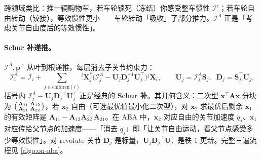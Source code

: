 跨领域类比：推一辆购物车，若车轮锁死（冻结）你感受整车惯性 $\mathcal I^c$；若车轮自由转动（铰接），等效惯性更小——车轮转动「吸收」了部分推力。$\mathcal I^A$ 正是「考虑关节自由度后的等效惯性」。

\paragraph{Schur 补递推。}
$\mathcal I^A,\mathbf p^A$ 从叶到根递推，每层消去子关节约束力：
\begin{equation}
  \mathcal I_i^A=\mathcal I_i+\sum_{j\in\text{children}(i)}{}^i\mathbf X_j^*\Big(\mathcal I_j^A-\mathbf U_j\mathbf D_j^{-1}\mathbf U_j^\top\Big){}^j\mathbf X_i,
  \qquad \mathbf U_j=\mathcal I_j^A\mathbf S_j,\;\; \mathbf D_j=\mathbf S_j^\top\mathbf U_j.
  \label{eq:on-aba-schur}
\end{equation}
括号内 $\mathcal I_j^A-\mathbf U_j\mathbf D_j^{-1}\mathbf U_j^\top$ 正是经典的 \textbf{Schur 补}。其几何含义：二次型 $\mathbf x^\top\mathbf A\mathbf x$ 分块为 $\begin{psmallmatrix}\mathbf A_{11}&\mathbf A_{12}\\ \mathbf A_{21}&\mathbf A_{22}\end{psmallmatrix}$，若 $\mathbf x_2$ 自由（可选最优值最小化二次型），对 $\mathbf x_2$ 求最优后剩余 $\mathbf x_1$ 的有效矩阵是 $\mathbf A_{11}-\mathbf A_{12}\mathbf A_{22}^{-1}\mathbf A_{21}$。在 ABA 中，$\mathbf x_2$ 对应自由的关节加速度 $\ddot q_j$、$\mathbf x_1$ 对应传给父节点的加速度——「消去 $\ddot q_j$」即「让关节自由运动，看父节点感受多少等效惯性」。对 revolute 关节 $\mathbf D_j$ 是标量，$\mathbf U_j\mathbf D_j^{-1}\mathbf U_j^\top$ 是秩-1 更新。完整三遍流程见 \cref{algo:on-aba}。

